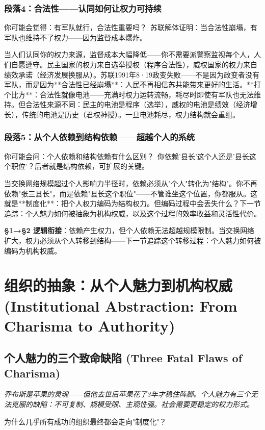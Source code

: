 \documentclass[a4paper,12pt]{book}
\newenvironment{motivation}{\begin{tcolorbox}[colback=gray!10,colframe=gray!60,title=\textit{本章动机 (Motivation)},fonttitle=\bfseries,arc=0mm,leftrule=3mm]\small\itshape}{\end{tcolorbox}}
\newenvironment{questionbox}{\begin{tcolorbox}[colback=red!3!white,colframe=red!60!black]}{\end{tcolorbox}}
\begin{document}
\begin{motivation}
\begin{motivation}
\begin{motivation}
	\subsubsection*{段落4：合法性——认同如何让权力可持续}

	\begin{tcolorbox}[colback=yellow!5, title=\textit{读者行为预测}]
		你可能会觉得：有军队就行，合法性重要吗？\ 苏联解体证明：当合法性崩塌，有军队也维持不了权力——因为监督成本爆炸。
	\end{tcolorbox}

当人们认同你的权力来源，监督成本大幅降低——你不需要派警察监视每个人，人们自愿遵守。民主国家的权力来自选举授权（程序合法性），威权国家的权力来自绩效承诺（经济发展换服从）。苏联1991年8·19政变失败——不是因为政变者没有军队，而是因为**合法性已经崩塌**：人民不再相信苏共能带来更好的生活。**打个比方**：合法性就像电池——充满时权力运转流畅，耗尽时即使有军队也无法维持。但合法性来源不同：民主的电池是程序（选举），威权的电池是绩效（经济增长），传统的电池是历史（君权神授）。一旦电池耗尽，权力结构就会重组。

	\subsubsection*{段落5：从个人依赖到结构依赖——超越个人的系统}

	\begin{tcolorbox}[colback=yellow!5, title=\textit{读者行为预测}]
		你可能会问：个人依赖和结构依赖有什么区别？\ 你依赖'县长'这个人还是'县长这个职位'？后者就是结构依赖，可扩展的关键。
	\end{tcolorbox}

当交换网络规模超过个人影响力半径时，依赖必须从"个人"转化为"结构"。你不再依赖"张三县长"，而是依赖"县长这个职位"——不管谁坐这个位置，你都服从。这就是**制度化**：把个人权力编码为结构权力。但编码过程中会丢失什么？下一节追踪：个人魅力如何被抽象为机构权威，以及这个过程的效率收益和灵活性代价。

	\textbf{§1→§2 逻辑衔接}：依赖产生权力，但个人依赖无法超越规模限制。当交换网络扩大，权力必须从个人转移到结构——下一节追踪这个转移过程：个人魅力如何被编码为机构权威。
	\section{组织的抽象：从个人魅力到机构权威 (Institutional Abstraction: From Charisma to Authority)}

	\subsection{个人魅力的三个致命缺陷 (Three Fatal Flaws of Charisma)}
	\begin{motivation}
		乔布斯是苹果的灵魂——但他去世后苹果花了3年才稳住阵脚。个人魅力有三个无法克服的缺陷：不可复制、规模受限、主观性强。社会需要更稳定的权力形式。
	\end{motivation}
	\begin{questionbox}
		为什么几乎所有成功的组织最终都会走向"制度化"？
	\end{questionbox}


\end{motivation}
\end{motivation}
\end{motivation}
\end{document}
